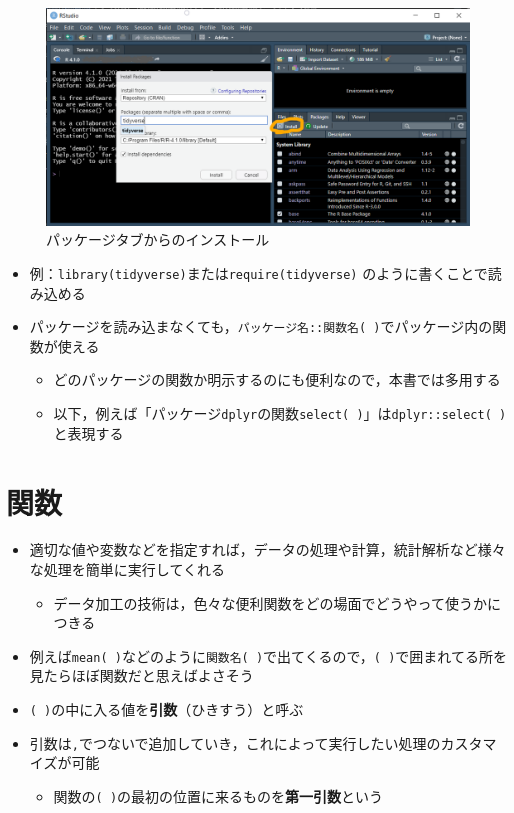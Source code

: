 \documentclass[
  xelatex,ja=standard, b5paper]{bxjsbook}
\providecommand{\tightlist}{%
  \setlength{\itemsep}{0pt}\setlength{\parskip}{0pt}}
\begin{document}
\begin{figure}

{\centering \includegraphics[width=0.6\linewidth]{images/package_install} 

}

\caption{パッケージタブからのインストール}\label{fig:pinst}
\end{figure}

\begin{itemize}
\tightlist
\item
  例：\texttt{library(tidyverse)}または\texttt{require(tidyverse)} のように書くことで読み込める
\item
  パッケージを読み込まなくても，\texttt{パッケージ名::関数名(\ )}でパッケージ内の関数が使える

  \begin{itemize}
  \tightlist
  \item
    どのパッケージの関数か明示するのにも便利なので，本書では多用する
  \item
    以下，例えば「パッケージ\texttt{dplyr}の関数\texttt{select(\ )}」は\texttt{dplyr::select(\ )}と表現する
  \end{itemize}
\end{itemize}

\hypertarget{p-function}{%
\section{関数}\label{p-function}}

\begin{itemize}
\tightlist
\item
  適切な値や変数などを指定すれば，データの処理や計算，統計解析など様々な処理を簡単に実行してくれる

  \begin{itemize}
  \tightlist
  \item
    データ加工の技術は，色々な便利関数をどの場面でどうやって使うかにつきる
  \end{itemize}
\item
  例えば\texttt{mean(\ )}などのように\texttt{関数名(\ )}で出てくるので，\texttt{(\ )}で囲まれてる所を見たらほぼ関数だと思えばよさそう
\item
  \texttt{(\ )}の中に入る値を\textbf{引数}（ひきすう）と呼ぶ
\item
  引数は\texttt{,}でつないで追加していき，これによって実行したい処理のカスタマイズが可能

  \begin{itemize}
  \tightlist
  \item
    関数の\texttt{(\ )}の最初の位置に来るものを\textbf{第一引数}という
  \end{itemize}
\end{itemize}
\end{document}
